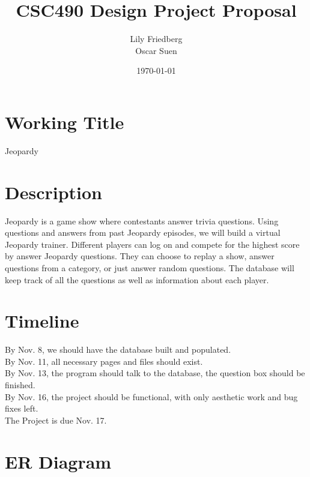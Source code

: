 \documentclass[12pt]{article}
\title{CSC490 Design Project Proposal}
\author{Lily Friedberg \\ Oscar Suen}
\date{\today}
\begin{document}
\maketitle

\section{Working Title}
Jeopardy
\section{Description}
Jeopardy is a game show where contestants answer trivia questions.  Using questions and answers from past Jeopardy episodes, we will build a virtual Jeopardy trainer.  Different players can log on and compete for the highest score by answer Jeopardy questions.  They can choose to replay a show, answer questions from a category, or just answer random questions.  The database will keep track of all the questions as well as information about each player.
\section{Timeline}
By Nov. 8, we should have the database built and populated. \\
By Nov. 11, all necessary pages and files should exist. \\
By Nov. 13, the program should talk to the database, the question box should be finished. \\
By Nov. 16, the project should be functional, with only aesthetic work and bug fixes left. \\
The Project is due Nov. 17.
\section{ER Diagram}
\end{document}
